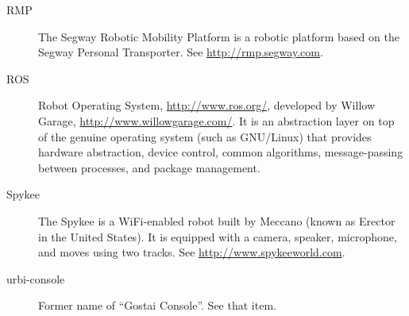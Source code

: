 \begin{description}
\item[RMP] The Segway Robotic Mobility Platform is a robotic platform based
  on the Segway Personal Transporter.  See \url{http://rmp.segway.com}.

\item[ROS] Robot Operating System, \url{http://www.ros.org/}, developed by
  Willow Garage, \url{http://www.willowgarage.com/}.  It is an abstraction
  layer on top of the genuine operating system (such as GNU/Linux) that
  provides hardware abstraction, device control, common algorithms,
  message-passing between processes, and package management.

\item[Spykee] The Spykee is a WiFi-enabled robot built by Meccano (known as
  Erector in the United States). It is equipped with a camera, speaker,
  microphone, and moves using two tracks. See
  \url{http://www.spykeeworld.com}.

\item[urbi-console] Former name of ``Gostai Console''.  See that item.
\end{description}

